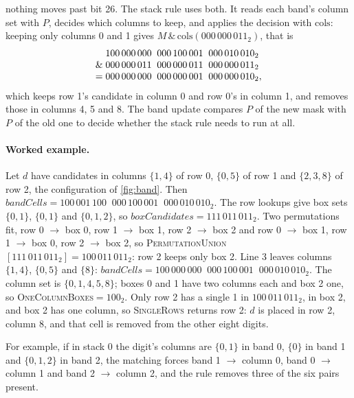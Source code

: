 nothing moves past bit 26. The stack rule uses both. It reads each band's column set with $P$, decides which columns
to keep, and applies the decision with $\mathrm{cols}$: keeping only columns 0 and 1 gives
$M \,\&\, \mathrm{cols}(000\,000\,011_2)$, that is
\[ \begin{array}{r@{\;}l}
 & 100\,000\,000\;\;000\,100\,001\;\;000\,010\,010_2 \\
 \& & 000\,000\,011\;\;000\,000\,011\;\;000\,000\,011_2 \\
 = & 000\,000\,000\;\;000\,000\,001\;\;000\,000\,010_2,
\end{array} \]
which keeps row 1's candidate in column 0 and row 0's in column 1,
and removes those in columns 4, 5 and 8. The band update compares $P$ of the new mask with $P$ of the old one to decide
whether the stack rule needs to run at all.


\paragraph{Worked example.} Let $d$ have candidates in columns $\{1,4\}$ of row 0, $\{0,5\}$ of row 1 and $\{2,3,8\}$
of row 2, the configuration of \cref{fig:band}. Then $\mathit{bandCells}=100\,001\,100\;\;000\,100\,001\;\;000\,010\,010_2$.
The row lookups give box sets $\{0,1\}$, $\{0,1\}$ and $\{0,1,2\}$, so
$\mathit{boxCandidates}=111\,011\,011_2$. Two permutations fit, row 0 $\to$ box 0, row 1 $\to$ box 1, row 2 $\to$ box 2
and row 0 $\to$ box 1, row 1 $\to$ box 0, row 2 $\to$ box 2, so
\textsc{PermutationUnion}$[111\,011\,011_2]=100\,011\,011_2$: row 2 keeps only box 2. Line 3 leaves columns $\{1,4\}$,
$\{0,5\}$ and $\{8\}$: $\mathit{bandCells}=100\,000\,000\;\;000\,100\,001\;\;000\,010\,010_2$. The column set is
$\{0,1,4,5,8\}$; boxes 0 and 1 have two columns each and box 2 one, so \textsc{OneColumnBoxes}$=100_2$. Only row 2 has
a single 1 in $100\,011\,011_2$, in box 2, and box 2 has one column, so \textsc{SingleRows} returns row 2: $d$ is placed
in row 2, column 8, and that cell is removed from the other eight digits.


For example, if in stack 0 the digit's columns are $\{0,1\}$ in band 0, $\{0\}$ in band 1 and
$\{0,1,2\}$ in band 2, the matching forces band 1 $\to$ column 0, band 0 $\to$ column 1 and band 2 $\to$ column 2, and
the rule removes three of the six pairs present. 


